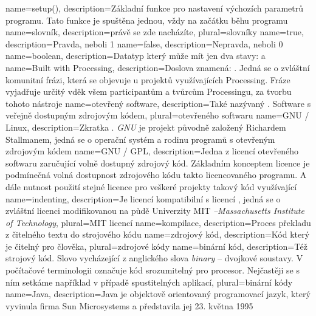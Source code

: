 {
  name={setup()},
  description={Základní funkce pro nastavení výchozích parametrů programu. Tato funkce je spuštěna jednou, vždy na začátku běhu programu}
}
{
  name={slovník},
  description={právě se zde nacházíte},
  plural={slovníky}
}
{
  name={true},
  description={Pravda, neboli 1}
}
{
  name={false},
  description={Nepravda, neboli 0}
}
{
  name={boolean},
  description={Datatyp který může mít jen dva stavy:  a }
}
{
	name={Built with Processing},
	description={Doslova znamená: . Jedná se o zvláštní komunitní frázi, která se objevuje u projektů využívajících Processing. Fráze vyjadřuje určitý vděk všem participantům a tvůrcům Processingu, za tvorbu tohoto nástroje}
}
{
  name={otevřený software},
  description={Také nazývaný . Software s veřejně dostupným zdrojovým kódem},
  plural={otevřeného softwaru}
}
{
  name={GNU / Linux},
  description={Zkratka . {\em GNU} je projekt původně založený Richardem Stallmanem, jedná se o operační systém a rodinu programů s otevřeným zdrojovým kódem}
}
{
  name={GNU / GPL},
  description={Jedna z licencí otevřeného softwaru zaručující volně dostupný zdrojový kód. Základním konceptem licence je podmínečná volná dostupnost zdrojového kódu takto licencovaného programu. A dále nutnost použití stejné licence pro veškeré projekty takový kód využívající}
}
{
  name={indenting},
  description={Je licencí kompatibilní s licencí , jedná se o zvláštní licenci modifikovanou na půdě Univerzity MIT {\em --Massachusetts Institute of Technology}},
  plural={MIT licencí}
}
{
	name={kompilace},
	description={Proces překladu z čitelného textu do strojového kódu}
}
{
	name={zdrojový kód},
	description={Kód který je čitelný pro člověka},
	plural={zdrojové kódy}
}
{
	name={binární kód},
	description={Též strojový kód. Slovo vycházející z anglického slova {\em binary} -- dvojkové soustavy. V počítačové terminologii označuje kód srozumitelný pro procesor. Nejčastěji se s ním setkáme například v případě spustitelných aplikací},
	plural={binární kódy}
}
{
	name={Java},
	description={Java je objektově orientovaný programovací jazyk, který vyvinula firma Sun Microsystems a představila jej 23. května 1995}
}
